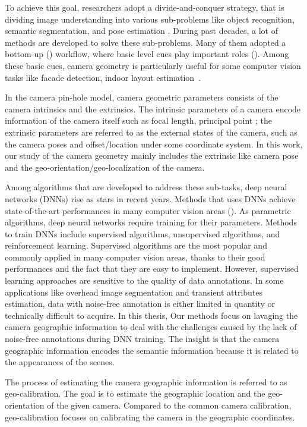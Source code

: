 To achieve this
goal, researchers adopt a divide-and-conquer strategy, that is
dividing image understanding into various sub-problems like object
recognition, semantic segmentation, and pose estimation \etc.  During
past decades, a lot of methods are developed to solve these
sub-problems. Many of them adopted a bottom-up ()
workflow, where basic level cues play important roles
(). Among these basic cues, camera geometry is
particularly useful for some computer vision tasks like facade
detection, indoor layout estimation~\cite{ren2016coarse}.

 
In the camera pin-hole model, camera geometric parameters consists of
the camera intrinsics and the extrinsics. The intrinsic parameters of
a camera encode information of the camera itself such as focal length,
principal point \etc; the extrinsic parameters are referred to as the
external states of the camera, such as the camera poses and
offset/location under some coordinate system. In this work, our study
of the camera geometry mainly includes the extrinsic like camera pose
and the geo-orientation/geo-localization of the camera.

\sepline

Among algorithms that are developed to address these sub-tasks, deep
neural networks (DNNs) rise as stars in recent years. Methods that
uses DNNs achieve state-of-the-art performances in many computer
vision areas (). As parametric algorithms, deep neural
networks require training for their parameters. Methods to train DNNs
include supervised algorithms, unsupervised algorithms, and
reinforcement learning. Supervised algorithms are the most popular and
commonly applied in many computer vision areas, thanks to their good
performances and the fact that they are easy to implement. However,
supervised learning approaches are sensitive to the quality of data
annotations. In some applications like overhead image segmentation and
transient attributes estimation, data with noise-free annotation is
either limited in quantity or technically difficult to acquire.
In this thesis, Our methods focus on lavaging the camera geographic
information to deal with the challenges caused by the lack of
noise-free annotations during DNN training. The insight is
that the camera geographic information encodes the semantic
information because it is related to the appearances of
the scenes.

The process of estimating the camera geographic information is
referred to as geo-calibration. The goal is to estimate the geographic
location and the geo-orientation of the given camera. 
Compared to the common camera calibration, geo-calibration focuses on
calibrating the camera in the geographic coordinates. 

